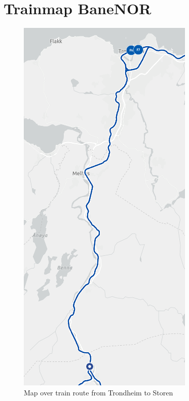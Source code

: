 \chapter{Trainmap BaneNOR}
\label{app:jlscicomp}

\begin{figure}[h]
    \centering
    \includegraphics[scale=0.5]{figures/togkart.png}
    \caption{Map over train route from Trondheim to Storen}
    \label{fig:trainmap}
\end{figure}